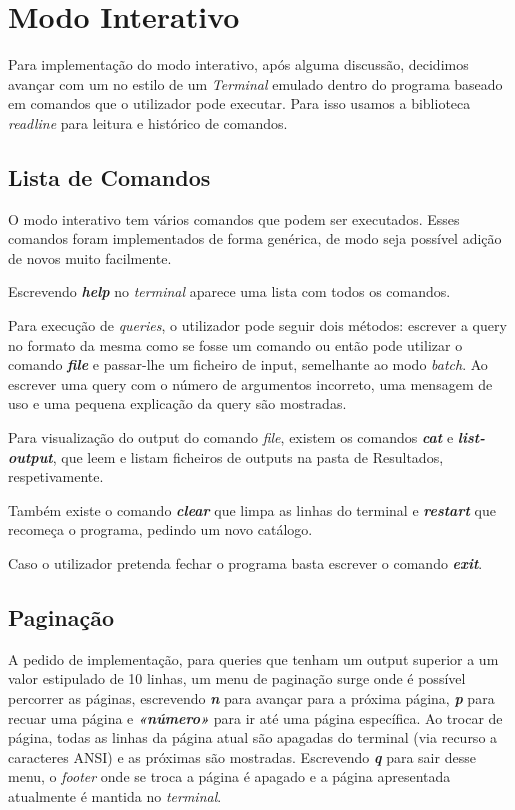 \documentclass{article}
\begin{document}
    \section{Modo Interativo}
            Para implementação do modo interativo, após alguma discussão, 
            decidimos avançar com um no estilo de um \emph{Terminal} emulado dentro do programa
            baseado em comandos que o utilizador pode executar.
            Para isso usamos a biblioteca \emph{readline} para leitura e histórico de comandos.
        \subsection{Lista de Comandos}
            O modo interativo tem vários comandos que podem ser executados.
            Esses comandos foram implementados de forma genérica, de modo seja possível adição de novos muito facilmente.

            \medskip
            Escrevendo \textit{\textbf{help}} no \textit{terminal }aparece uma lista com todos os comandos.

            Para execução de \emph{queries}, o utilizador pode seguir dois métodos: escrever a query
            no formato da mesma como se fosse um comando 
            ou então pode utilizar o comando \textit{\textbf{file}} e passar-lhe um ficheiro
            de input, semelhante ao modo \textit{batch}. Ao escrever uma query com o número de argumentos
            incorreto, uma mensagem de uso e uma pequena explicação da query são mostradas.

            Para visualização do output do comando \textit{file}, existem os comandos
            \textit{\textbf{cat}} e \textit{\textbf{list-output}}, que leem e listam ficheiros de outputs
            na pasta de Resultados, respetivamente.

            Também existe o comando \textit{\textbf{clear}} que limpa as linhas do terminal
            e \textit{\textbf{restart}} que recomeça o programa, pedindo um novo catálogo.

            Caso o utilizador pretenda fechar o programa basta escrever o comando \textit{\textbf{exit}}.
    
        \subsection{Paginação}
            A pedido de implementação, para queries que tenham um output superior a um valor estipulado de 10 linhas,
            um menu de paginação surge onde é possível percorrer as páginas, escrevendo \textit{\textbf{n}} para avançar
            para a próxima página, \textit{\textbf{p}} para recuar uma página e \textit{\textbf{«número»}}
            para ir até uma página específica.
            Ao trocar de página, todas as linhas da página atual são apagadas do terminal
            (via recurso a caracteres ANSI) e as próximas são mostradas.
            Escrevendo \textit{\textbf{q}} para sair desse menu, o \textit{footer} 
            onde se troca a página é apagado e a página apresentada atualmente é mantida no \textit{terminal}.
\end{document}
